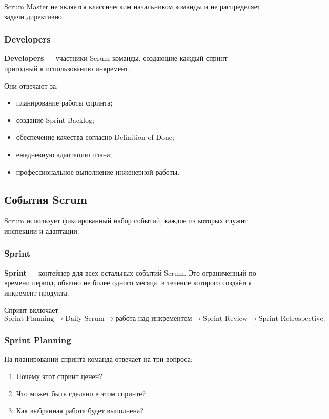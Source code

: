 \documentclass[12pt,a4paper]{article}
\begin{document}
Scrum Master не является классическим начальником команды и не распределяет задачи директивно.

\subsubsection{Developers}

\textbf{Developers} --- участники Scrum-команды, создающие каждый спринт пригодный к использованию инкремент.

Они отвечают за:
\begin{itemize}
    \item планирование работы спринта;
    \item создание Sprint Backlog;
    \item обеспечение качества согласно Definition of Done;
    \item ежедневную адаптацию плана;
    \item профессиональное выполнение инженерной работы.
\end{itemize}

\subsection{События Scrum}

Scrum использует фиксированный набор событий, каждое из которых служит инспекции и адаптации.

\subsubsection{Sprint}

\textbf{Sprint} --- контейнер для всех остальных событий Scrum. Это ограниченный по времени период, обычно не более одного месяца, в течение которого создаётся инкремент продукта.

Спринт включает:
\[
\text{Sprint Planning} \rightarrow
\text{Daily Scrum} \rightarrow
\text{работа над инкрементом} \rightarrow
\text{Sprint Review} \rightarrow
\text{Sprint Retrospective}.
\]

\subsubsection{Sprint Planning}

На планировании спринта команда отвечает на три вопроса:
\begin{enumerate}
    \item Почему этот спринт ценен?
    \item Что может быть сделано в этом спринте?
    \item Как выбранная работа будет выполнена?
\end{enumerate}
\end{document}
